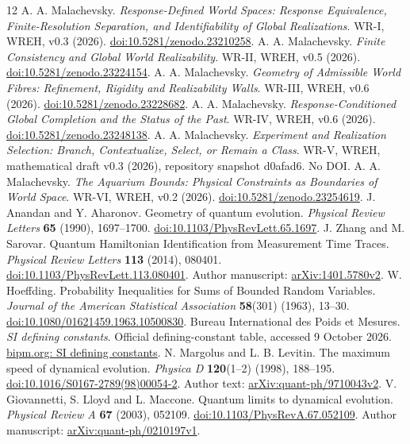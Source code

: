 \begingroup\small\raggedright
\begin{thebibliography}{12}
\setlength{\itemsep}{2pt}\setlength{\parsep}{0pt}
 A. A. Malachevsky. \emph{Response-Defined World Spaces: Response Equivalence, Finite-Resolution Separation, and Identifiability of Global Realizations}. WR-I, WREH, v0.3 (2026). \href{https://doi.org/10.5281/zenodo.23210258}{doi:10.5281/zenodo.23210258}.
 A. A. Malachevsky. \emph{Finite Consistency and Global World Realizability}. WR-II, WREH, v0.5 (2026). \href{https://doi.org/10.5281/zenodo.23224154}{doi:10.5281/zenodo.23224154}.
 A. A. Malachevsky. \emph{Geometry of Admissible World Fibres: Refinement, Rigidity and Realizability Walls}. WR-III, WREH, v0.6 (2026). \href{https://doi.org/10.5281/zenodo.23228682}{doi:10.5281/zenodo.23228682}.
 A. A. Malachevsky. \emph{Response-Conditioned Global Completion and the Status of the Past}. WR-IV, WREH, v0.6 (2026). \href{https://doi.org/10.5281/zenodo.23248138}{doi:10.5281/zenodo.23248138}.
 A. A. Malachevsky. \emph{Experiment and Realization Selection: Branch, Contextualize, Select, or Remain a Class}. WR-V, WREH, mathematical draft v0.3 (2026), repository snapshot d0afad6. No DOI.
 A. A. Malachevsky. \emph{The Aquarium Bounds: Physical Constraints as Boundaries of World Space}. WR-VI, WREH, v0.2 (2026). \href{https://doi.org/10.5281/zenodo.23254619}{doi:10.5281/zenodo.23254619}.
 J. Anandan and Y. Aharonov. Geometry of quantum evolution. \emph{Physical Review Letters} \textbf{65} (1990), 1697--1700. \href{https://doi.org/10.1103/PhysRevLett.65.1697}{doi:10.1103/PhysRevLett.65.1697}.
 J. Zhang and M. Sarovar. Quantum Hamiltonian Identification from Measurement Time Traces. \emph{Physical Review Letters} \textbf{113} (2014), 080401. \href{https://doi.org/10.1103/PhysRevLett.113.080401}{doi:10.1103/PhysRevLett.113.080401}. Author manuscript: \href{https://arxiv.org/abs/1401.5780v2}{arXiv:1401.5780v2}.
 W. Hoeffding. Probability Inequalities for Sums of Bounded Random Variables. \emph{Journal of the American Statistical Association} \textbf{58}(301) (1963), 13--30. \href{https://doi.org/10.1080/01621459.1963.10500830}{doi:10.1080/01621459.1963.10500830}.
 Bureau International des Poids et Mesures. \emph{SI defining constants}. Official defining-constant table, accessed 9 October 2026. \href{https://www.bipm.org/en/measurement-units/si-defining-constants}{bipm.org: SI defining constants}.
 N. Margolus and L. B. Levitin. The maximum speed of dynamical evolution. \emph{Physica D} \textbf{120}(1--2) (1998), 188--195. \href{https://doi.org/10.1016/S0167-2789(98)00054-2}{doi:10.1016/S0167-2789(98)00054-2}. Author text: \href{https://arxiv.org/abs/quant-ph/9710043v2}{arXiv:quant-ph/9710043v2}.
 V. Giovannetti, S. Lloyd and L. Maccone. Quantum limits to dynamical evolution. \emph{Physical Review A} \textbf{67} (2003), 052109. \href{https://doi.org/10.1103/PhysRevA.67.052109}{doi:10.1103/PhysRevA.67.052109}. Author manuscript: \href{https://arxiv.org/abs/quant-ph/0210197v1}{arXiv:quant-ph/0210197v1}.
\end{thebibliography}\endgroup
